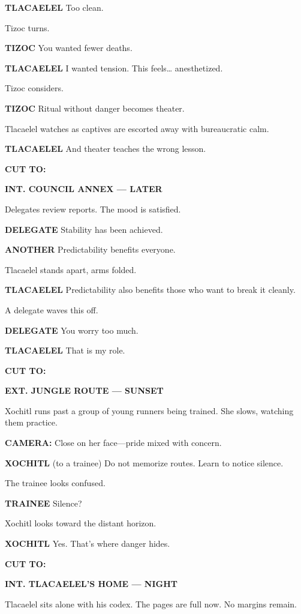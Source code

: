 \documentclass[12pt]{article}
\begin{document}
\textbf{TLACAELEL}  
Too clean.

Tizoc turns.

\textbf{TIZOC}  
You wanted fewer deaths.

\textbf{TLACAELEL}  
I wanted tension.  
This feels… anesthetized.

Tizoc considers.

\textbf{TIZOC}  
Ritual without danger becomes theater.

Tlacaelel watches as captives are escorted away with bureaucratic calm.

\textbf{TLACAELEL}  
And theater teaches the wrong lesson.

\textbf{CUT TO:}

\textbf{INT. COUNCIL ANNEX — LATER}

Delegates review reports. The mood is satisfied.

\textbf{DELEGATE}  
Stability has been achieved.

\textbf{ANOTHER}  
Predictability benefits everyone.

Tlacaelel stands apart, arms folded.

\textbf{TLACAELEL}  
Predictability also benefits those  
who want to break it cleanly.

A delegate waves this off.

\textbf{DELEGATE}  
You worry too much.

\textbf{TLACAELEL}  
That is my role.

\textbf{CUT TO:}

\textbf{EXT. JUNGLE ROUTE — SUNSET}

Xochitl runs past a group of young runners being trained. She slows, watching them practice.

\textbf{CAMERA:} Close on her face—pride mixed with concern.

\textbf{XOCHITL}  
(to a trainee)  
Do not memorize routes.  
Learn to notice silence.

The trainee looks confused.

\textbf{TRAINEE}  
Silence?

Xochitl looks toward the distant horizon.

\textbf{XOCHITL}  
Yes.  
That’s where danger hides.

\textbf{CUT TO:}

\textbf{INT. TLACAELEL’S HOME — NIGHT}

Tlacaelel sits alone with his codex. The pages are full now. No margins remain.
\end{document}

